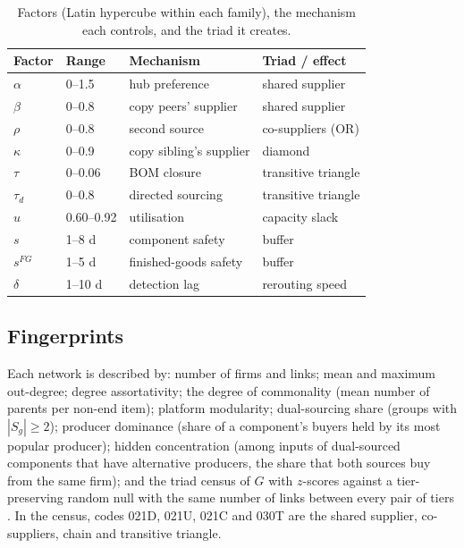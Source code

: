 \documentclass{ifacconf}
\begin{document}
\begin{table}[t]
\caption{Factors (Latin hypercube within each family), the mechanism each controls, and the triad it creates.}
\label{tab:controls}
\centering\footnotesize
\setlength{\tabcolsep}{3pt}
\begin{tabular}{llll}
\toprule
Factor & Range & Mechanism & Triad / effect \\
\midrule
$\alpha$ & 0--1.5 & hub preference & shared supplier \\
$\beta$ & 0--0.8 & copy peers' supplier & shared supplier \\
$\rho$ & 0--0.8 & second source & co-suppliers (OR) \\
$\kappa$ & 0--0.9 & copy sibling's supplier & diamond \\
$\tau$ & 0--0.06 & BOM closure & transitive triangle \\
$\tau_d$ & 0--0.8 & directed sourcing & transitive triangle \\
$u$ & 0.60--0.92 & utilisation & capacity slack \\
$s$ & 1--8 d & component safety & buffer \\
$s^{FG}$ & 1--5 d & finished-goods safety & buffer \\
$\delta$ & 1--10 d & detection lag & rerouting speed \\
\bottomrule
\end{tabular}
\end{table}

\subsection{Fingerprints}
Each network is described by: number of firms and links; mean and maximum out-degree; degree assortativity; the degree of commonality \citep{Collier1981} (mean number of parents per non-end item); platform modularity; dual-sourcing share (groups with $|S_g|\ge2$); producer dominance (share of a component's buyers held by its most popular producer); hidden concentration (among inputs of dual-sourced components that have alternative producers, the share that both sources buy from the same firm); and the triad census of $G$ with $z$-scores against a tier-preserving random null with the same number of links between every pair of tiers \citep{Milo2002}. In the census, codes 021D, 021U, 021C and 030T are the shared supplier, co-suppliers, chain and transitive triangle.

\end{document}
